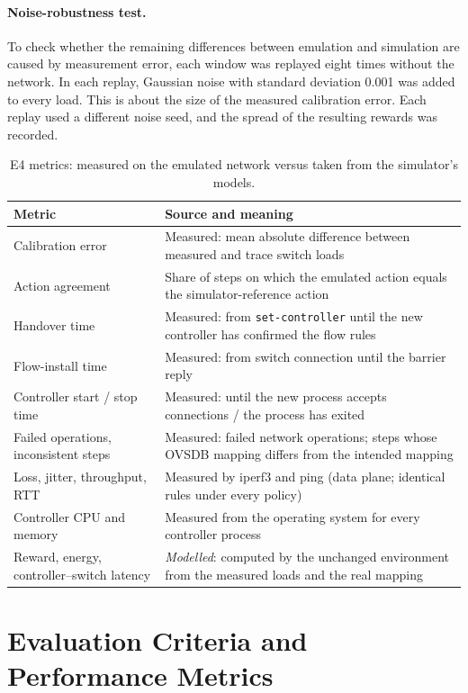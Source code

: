 \paragraph{Noise-robustness test.} To check whether the remaining differences between emulation and simulation are caused by measurement error, each window was replayed eight times without the network. In each replay, Gaussian noise with standard deviation 0.001 was added to every load. This is about the size of the measured calibration error. Each replay used a different noise seed, and the spread of the resulting rewards was recorded.

\begin{table}[htbp]
\centering
\caption{E4 metrics: measured on the emulated network versus taken from the simulator's models.}
\label{tab:mn-metrics}
\small
\begin{tabularx}{\textwidth}{@{}p{4.2cm}L@{}}
\toprule
\textbf{Metric} & \textbf{Source and meaning}\\
\midrule
Calibration error & Measured: mean absolute difference between measured and trace switch loads\\
Action agreement & Share of steps on which the emulated action equals the simulator-reference action\\
Handover time & Measured: from \texttt{set-controller} until the new controller has confirmed the flow rules\\
Flow-install time & Measured: from switch connection until the barrier reply\\
Controller start / stop time & Measured: until the new process accepts connections / the process has exited\\
Failed operations, inconsistent steps & Measured: failed network operations; steps whose OVSDB mapping differs from the intended mapping\\
Loss, jitter, throughput, RTT & Measured by iperf3 and ping (data plane; identical rules under every policy)\\
Controller CPU and memory & Measured from the operating system for every controller process\\
Reward, energy, controller--switch latency & \emph{Modelled}: computed by the unchanged environment from the measured loads and the real mapping\\
\bottomrule
\end{tabularx}
\end{table}

\section{Evaluation Criteria and Performance Metrics}
\label{sec:metrics}

